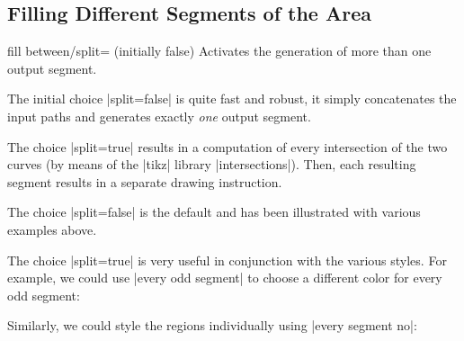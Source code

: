 \subsection{Filling Different Segments of the Area}
\begin{tikzkey}{fill between/split= (initially false)}
	Activates the generation of more than one output segment. 

	The initial choice |split=false| is quite fast and robust, it simply concatenates the input paths and generates exactly \emph{one} output segment.

	The choice |split=true| results in a computation of every intersection of the two curves (by means of the |tikz| library |intersections|). Then, each resulting segment results in a separate drawing instruction.

	The choice |split=false| is the default and has been illustrated with various examples above.

	The choice |split=true| is very useful in conjunction with the various styles. For example, we could use  |every odd segment| to choose a different color for every odd segment:

\begin{codeexample}[]
\end{codeexample}
	
	Similarly, we could style the regions individually using |every segment no|:
\begin{codeexample}[]
\end{codeexample}


\end{tikzkey}
